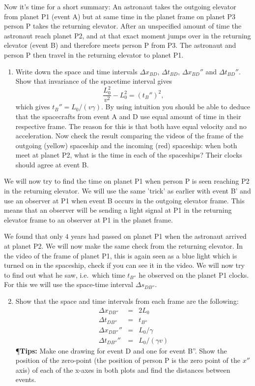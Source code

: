 {\begin{multicols}{2}
Now it's time for a short summary: An astronaut takes the outgoing elevator from planet P1 (event A) but at same time in the planet frame on planet P3 person P takes the returning elevator. After an unspecified amount of time the astronaut reach planet P2, and at that exact moment jumps over in the returning elevator (event B) and therefore meets person P from P3. The astronaut and person P then travel in the returning elevator to planet P1.

\begin{enumerate}
\item Write down the space and time intervals $\Delta x_{BD}$, $\Delta t_{BD}$, $\Delta x_{BD}''$ and $\Delta t_{BD}''$. Show that invariance of the spacetime interval gives
\[
\frac{L_0^2}{v^2}-L_0^2=(t_B'')^2,
\]
which gives $t_B''=L_0/(v\gamma)$. By using intuition you should be able to deduce that the spacecrafts from event A and D use equal amount of time in their respective frame. The reason for this is that both have equal velocity and no acceleration. Now check the result comparing the videos of the frame of the outgoing (yellow) spaceship and the incoming (red) spaceship: when both meet at planet P2, what is the time in each of the spaceships? Their clocks should agree at event B.
\end{enumerate}

We will now try to find the time on planet P1 when person P is seen reaching P2 in the returning elevator. We will use the same 'trick' as earlier with event B' and use an observer at P1 when event B occurs in the outgoing elevator frame. This means that an observer will be sending a light signal at P1 in the returning elevator frame to an observer at P1 in the planet frame.

We found that only $4$ years had passed on planet P1 when the astronaut arrived at planet P2. We will now make the same check from the returning elevator. In the video of the frame of planet P1, this is again seen as a blue light which is turned on in the spaceship, check if you can see it in the video. We will now try to find out what he saw, i.e.\ which time $t_{B''}$ he observed on the planet P1 clocks. For this we will use the space-time interval $\Delta s_{DB''}$.
\begin{enumerate}
\setcounter{enumi}{1} 
\item Show that the space and time intervals from each frame are the following:
\begin{eqnarray*}
\Delta x_{DB''}&=&2L_0\\
\Delta t_{DB''}&=&t_{B''}\\
\Delta x_{DB''}''&=&L_0/\gamma\\
\Delta t_{DB''}''&=&L_0/(\gamma v)
\end{eqnarray*}
{¶\bf Tips:} Make one drawing for event D and one for event B''. Show the position of the zero-point (the position of person P is the zero point of the $x''$ axis) of each of the x-axes in both plots and find the distances between events.


\end{enumerate}
\end{multicols}}
